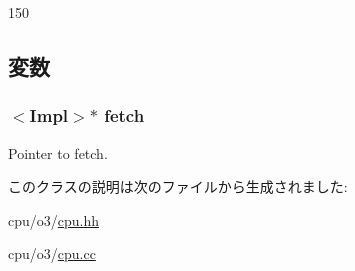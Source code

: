 \begin{DoxyCode}
150 { }
\end{DoxyCode}


\subsection{変数}
\hypertarget{classFullO3CPU_1_1IcachePort_a10f1a41fdcff6e7574a83b020d3c1a91}{
\subsubsection[{fetch}]{$<$Impl$>$$\ast$ {\bf fetch}}}
\label{classFullO3CPU_1_1IcachePort_a10f1a41fdcff6e7574a83b020d3c1a91}
Pointer to fetch. 

このクラスの説明は次のファイルから生成されました:\begin{DoxyCompactItemize}
\item 
cpu/o3/\hyperlink{o3_2cpu_8hh}{cpu.hh}\item 
cpu/o3/\hyperlink{o3_2cpu_8cc}{cpu.cc}\end{DoxyCompactItemize}
